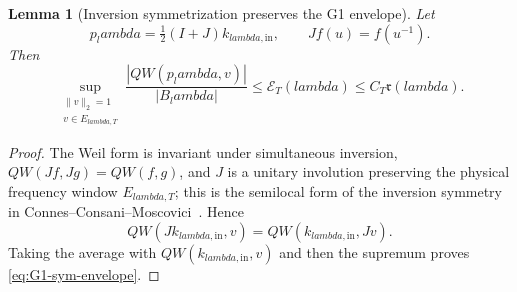 \documentclass[11pt]{article}
\def\lambda{lambda}%
\newtheorem{lemma}[theorem]{Lemma}
\theoremstyle{remark}
\begin{document}
\begin{lemma}[Inversion symmetrization preserves the G1 envelope]\label{lem:g1-inversion}
Let
\[
 p_\lambda=\tfrac12(I+J)k_{\lambda,\mathrm{in}},
 \qquad Jf(u)=f(u^{-1}).
\]
Then
\begin{equation}\label{eq:G1-sym-envelope}
 \sup_{\substack{\|v\|_2=1\\v\in E_{\lambda,T}}}
 \frac{|QW(p_\lambda,v)|}{|B_\lambda|}
 \le \mathcal E_T(\lambda)
 \le C_T\mathfrak r(\lambda).
\end{equation}
\end{lemma}
\begin{proof}
The Weil form is invariant under simultaneous inversion,
$QW(Jf,Jg)=QW(f,g)$, and $J$ is a unitary involution preserving the physical
frequency window $E_{\lambda,T}$; this is the semilocal form of the inversion
symmetry in Connes--Consani--Moscovici~\cite{ConnesConsaniMoscovici2025}.
Hence
\[
 QW(Jk_{\lambda,\mathrm{in}},v)
 =QW(k_{\lambda,\mathrm{in}},Jv).
\]
Taking the average with $QW(k_{\lambda,\mathrm{in}},v)$ and then the supremum
proves \eqref{eq:G1-sym-envelope}.
\end{proof}
\end{document}
